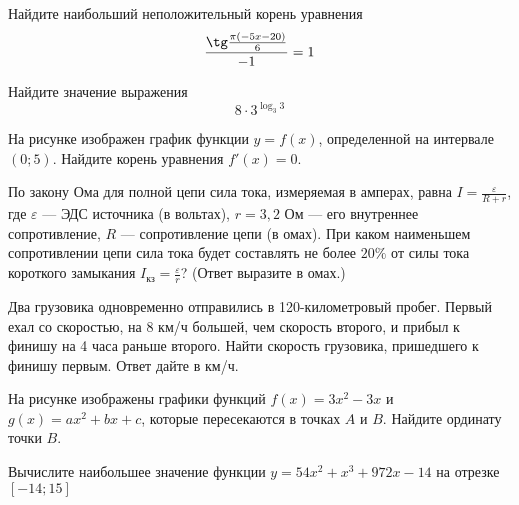 \documentclass[twocolumn]{article}
\begin{document}
\begin{taskBN}{5}
Найдите наибольший неположительный корень уравнения $$\frac{\tg\frac{\pi(-5x -20)}{6}}{-1}=1$$
\end{taskBN}

\begin{taskBN}{6}
Найдите значение выражения $$8\cdot {3}^{\log_{3}{3}} $$
\end{taskBN}

\begin{taskBN}{7}
На рисунке изображен график функции $y = f(x)$, определенной на интервале $(0; 5)$. Найдите корень уравнения $f'(x)=0$.\vspace{2.5cm}
\end{taskBN}

\begin{taskBN}{8}
По закону Ома для полной цепи сила тока, измеряемая в амперах, равна $I=\frac{\varepsilon}{R+r}$, где $\varepsilon$ — ЭДС источника (в вольтах), $r= 3{,}2 $ Ом — его внутреннее сопротивление, $R$ — сопротивление цепи (в омах). При каком наименьшем сопротивлении цепи сила тока будет составлять не более $20\%$ от силы тока короткого замыкания $I_{\mbox{кз}}=\frac{\varepsilon}{r}$? (Ответ выразите в омах.)
\end{taskBN}

\begin{taskBN}{9}
Два грузовика одновременно отправились в 120-километровый пробег. Первый ехал со скоростью, на 8 км/ч большей, чем скорость второго, и прибыл к финишу на 4 часа раньше второго. Найти скорость грузовика, пришедшего к финишу первым. Ответ дайте в км/ч.
\end{taskBN}

\begin{taskBN}{10}
На рисунке изображены графики функций $f(x)=3x^{2}-3x$ и $g(x)=ax^{2} +bx+c$, которые пересекаются в точках $A$ и $B$. Найдите ординату точки $B$.\vspace{2.5cm}
\end{taskBN}

\begin{taskBN}{11}
Вычислите наибольшее значение функции $y = 54x^{2}+x^{3}+972x-14$ на отрезке $\left[-14;15 \right]$
\end{taskBN}




\cleardoublepage
\def\examvart{Вариант 17.3}
\normalsize

\startpartone
\large
\end{document}
